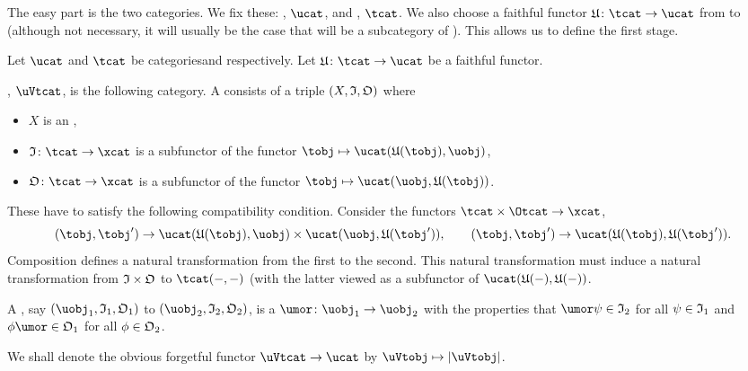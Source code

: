 \documentclass[%
a4paper,%
arxiv,%
defaults
]{myclass}
\begin{document}
\medskip

The easy part is the two categories.
We fix these: \ucat, \(\ucat\), and \tcat, \(\tcat\).
We also choose a faithful functor \(\ufunc \colon \tcat \to \ucat\) from \tcat to \ucat (although not necessary, it will usually be the case that \tcat will be a subcategory of \ucat).
This allows us to define the first stage.

\begin{defn}
Let \(\ucat\) and \(\tcat\) be categories\emhyp{}\ucat and \tcat respectively.
Let \(\ufunc \colon \tcat \to \ucat\) be a faithful functor.

\uVtcatu, \(\uVtcat\), is the following category.
A \emph{\uVtobj{}} consists of a triple \((X, \itest, \otest)\) where
%
\begin{itemize}
\item \(X\) is an \uobj,
\item \(\itest \colon \tcat \to \xcat\) is a subfunctor of the functor \(\tobj \mapsto \Hom{\ucat}{\ufunc(\tobj)}{\uobj}\),
\item \(\otest \colon \tcat \to \xcat\) is a subfunctor of the functor \(\tobj \mapsto \Hom{\ucat}{\uobj}{\ufunc(\tobj)}\).
\end{itemize}
%
These have to satisfy the following compatibility condition.
Consider the functors \(\tcat \times \Otcat \to \xcat\),
%
\[
(\tobj, \tobj') \to \Hom{\ucat}{\ufunc(\tobj)}{\uobj} \times \Hom{\ucat}{\uobj}{\ufunc(\tobj')},  \qquad (\tobj, \tobj') \to \Hom{\ucat}{\ufunc(\tobj)}{\ufunc(\tobj')}.
\]
%
Composition defines a natural transformation from the first to the second.
This natural transformation must induce a natural transformation from \(\itest \times \otest\) to \(\Hom{\tcat}{-}{-}\) (with the latter viewed as a subfunctor of \(\Hom{\ucat}{\ufunc(-)}{\ufunc(-)}\).

A \uVtmoralt, say \((\uobj_1, \itest_1, \otest_1)\) to  \((\uobj_2, \itest_2, \otest_2)\), is a \umor \(\umor \colon \uobj_1 \to \uobj_2\) with the properties that \(\umor \ifn \in \itest_2\) for all \(\ifn \in \itest_1\) and \(\ofn \umor \in \otest_1\) for all \(\ofn \in \otest_2\).

We shall denote the obvious forgetful functor \(\uVtcat \to \ucat\) by \(\uVtobj \mapsto \forfunc[\uVtobj]\).
\end{defn}
\end{document}
